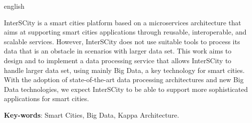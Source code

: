 \begin{resumo}[Abstract]
 \begin{otherlanguage*}{english}

     InterSCity is a smart cities platform based on a microservices
     architecture that aims at supporting smart cities applications through
     reusable, interoperable, and scalable services.
     However, InterSCity does not use suitable tools to process its data that is
     an obstacle in scenarios with larger data set. This work aims to design and to
     implement a data processing service that allows InterSCity to handle
     larger data set, using mainly Big Data, a key technology for smart cities.
     With the adoption of state-of-the-art data processing architectures and
     new Big Data technologies, we expect InterSCity to be able to support more
     sophisticated applications for smart cities.

   \vspace{\onelineskip}
 
   \noindent 
   \textbf{Key-words}: Smart Cities, Big Data, Kappa Architecture.
 \end{otherlanguage*}
\end{resumo}
